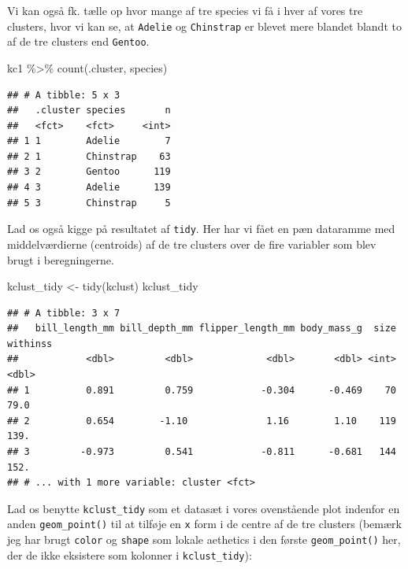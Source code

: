 \documentclass[
]{book}
\newenvironment{Shaded}{\begin{snugshade}}{\end{snugshade}}
\newcommand{\FunctionTok}[1]{\textcolor[rgb]{0.00,0.00,0.00}{#1}}
\newcommand{\NormalTok}[1]{#1}
\newcommand{\OtherTok}[1]{\textcolor[rgb]{0.56,0.35,0.01}{#1}}
\newcommand{\SpecialCharTok}[1]{\textcolor[rgb]{0.00,0.00,0.00}{#1}}
\begin{document}
Vi kan også fk. tælle op hvor mange af tre species vi få i hver af vores tre clusters, hvor vi kan se, at \texttt{Adelie} og \texttt{Chinstrap} er blevet mere blandet blandt to af de tre clusters end \texttt{Gentoo}.

\begin{Shaded}
\begin{Highlighting}[]
\NormalTok{kc1 }\SpecialCharTok{\%\textgreater{}\%}
  \FunctionTok{count}\NormalTok{(.cluster, species)}
\end{Highlighting}
\end{Shaded}

\begin{verbatim}
## # A tibble: 5 x 3
##   .cluster species       n
##   <fct>    <fct>     <int>
## 1 1        Adelie        7
## 2 1        Chinstrap    63
## 3 2        Gentoo      119
## 4 3        Adelie      139
## 5 3        Chinstrap     5
\end{verbatim}

Lad os også kigge på resultatet af \texttt{tidy}. Her har vi fået en pæn dataramme med middelværdierne (centroids) af de tre clusters over de fire variabler som blev brugt i beregningerne.

\begin{Shaded}
\begin{Highlighting}[]
\NormalTok{kclust\_tidy }\OtherTok{\textless{}{-}} \FunctionTok{tidy}\NormalTok{(kclust) }
\NormalTok{kclust\_tidy}
\end{Highlighting}
\end{Shaded}

\begin{verbatim}
## # A tibble: 3 x 7
##   bill_length_mm bill_depth_mm flipper_length_mm body_mass_g  size withinss
##            <dbl>         <dbl>             <dbl>       <dbl> <int>    <dbl>
## 1          0.891         0.759            -0.304      -0.469    70     79.0
## 2          0.654        -1.10              1.16        1.10    119    139. 
## 3         -0.973         0.541            -0.811      -0.681   144    152. 
## # ... with 1 more variable: cluster <fct>
\end{verbatim}

Lad os benytte \texttt{kclust\_tidy} som et datasæt i vores ovenstående plot indenfor en anden \texttt{geom\_point()} til at tilføje en \texttt{x} form i de centre af de tre clusters (bemærk jeg har brugt \texttt{color} og \texttt{shape} som lokale aethetics i den første \texttt{geom\_point()} her, der de ikke eksistere som kolonner i \texttt{kclust\_tidy}):
\end{document}
